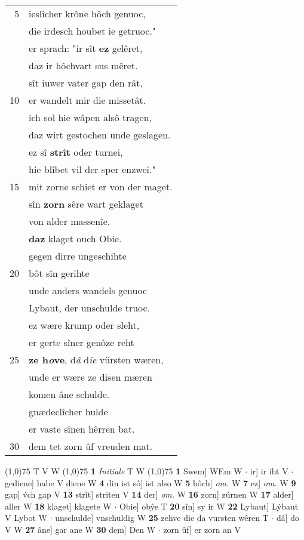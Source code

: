 \documentclass[8pt,a4paper,notitlepage]{article}
\begin{document}
\begin{table}[ht]
\begin{minipage}[t]{0.5\linewidth}
\begin{tabular}{rl}
5 & ieslîcher krône hôch genuoc,\\ 
 & die irdesch houbet ie getruoc."\\ 
 & er sprach: "ir sît \textbf{ez} gelêret,\\ 
 & daz ir hôchvart sus mêret.\\ 
 & sît iuwer vater gap den rât,\\ 
10 & er wandelt mir die missetât.\\ 
 & ich sol hie wâpen alsô tragen,\\ 
 & daz wirt gestochen unde geslagen.\\ 
 & ez sî \textbf{strît} oder turnei,\\ 
 & hie blîbet vil der sper enzwei."\\ 
15 & mit zorne schiet er von der maget.\\ 
 & sîn \textbf{zorn} sêre wart geklaget\\ 
 & von alder massenîe.\\ 
 & \textbf{daz} klaget ouch Obie.\\ 
 & gegen dirre ungeschihte\\ 
20 & bôt sîn gerihte\\ 
 & unde anders wandels genuoc\\ 
 & Lybaut, der unschulde truoc.\\ 
 & ez wære krump oder sleht,\\ 
 & er gerte sîner genôze reht\\ 
25 & \textbf{ze h\textit{o}ve}, d\textit{â} d\textit{ie} vürsten wæren,\\ 
 & unde er wære ze disen mæren\\ 
 & komen âne schulde.\\ 
 & gnædeclîcher hulde\\ 
 & er vaste sînen hêrren bat.\\ 
30 & dem tet zorn ûf vreuden mat.\\ 
\end{tabular}
\scriptsize
\line(1,0){75} \newline
T V W \newline
\line(1,0){75} \newline
\textbf{1} \textit{Initiale} T W  \newline
\line(1,0){75} \newline
\textbf{1} Swem] WEm W  $\cdot$ ir] ir iht V  $\cdot$ gediene] habe V diene W \textbf{4} diu ist sô] ist also W \textbf{5} hôch] \textit{om.} W \textbf{7} ez] \textit{om.} W \textbf{9} gap] v́ch gap V \textbf{13} strît] striten V \textbf{14} der] \textit{om.} W \textbf{16} zorn] zúrnen W \textbf{17} alder] aller W \textbf{18} klaget] klagete W  $\cdot$ Obie] obŷe T \textbf{20} sîn] sy ir W \textbf{22} Lybaut] Lẏbaut V Lybot W  $\cdot$ unschulde] vnschuldig W \textbf{25} zehve die da vursten wêren T  $\cdot$ dâ] do V W \textbf{27} âne] gar ane W \textbf{30} dem] Den W  $\cdot$ zorn ûf] er zorn an V \newline
\end{minipage}
\end{table}
\end{document}
